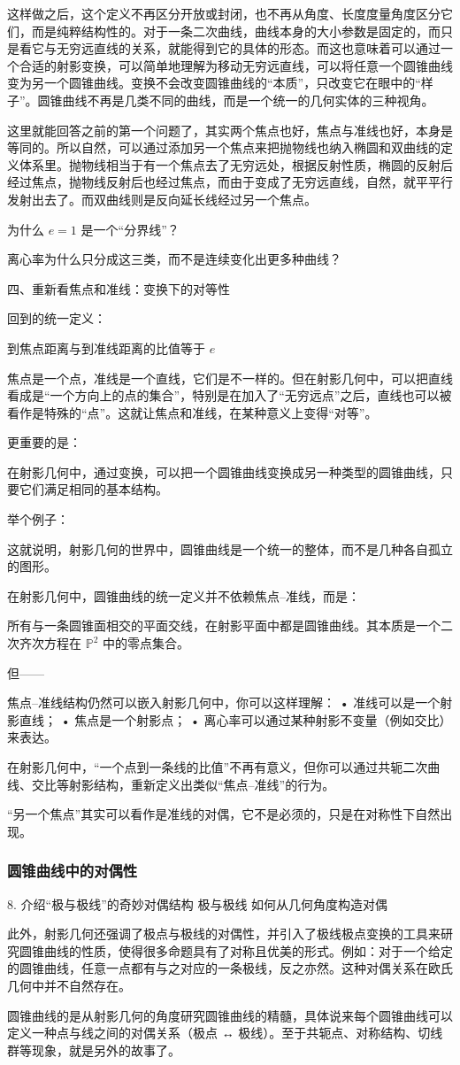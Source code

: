 这样做之后，这个定义不再区分开放或封闭，也不再从角度、长度度量角度区分它们，而是纯粹结构性的。对于一条二次曲线，曲线本身的大小参数是固定的，而只是看它与无穷远直线的关系，就能得到它的具体的形态。而这也意味着可以通过一个合适的射影变换，可以简单地理解为移动无穷远直线，可以将任意一个圆锥曲线变为另一个圆锥曲线。变换不会改变圆锥曲线的“本质”，只改变它在眼中的“样子”。圆锥曲线不再是几类不同的曲线，而是一个统一的几何实体的三种视角。

这里就能回答之前的第一个问题了，其实两个焦点也好，焦点与准线也好，本身是等同的。所以自然，可以通过添加另一个焦点来把抛物线也纳入椭圆和双曲线的定义体系里。抛物线相当于有一个焦点去了无穷远处，根据反射性质，椭圆的反射后经过焦点，抛物线反射后也经过焦点，而由于变成了无穷远直线，自然，就平平行发射出去了。而双曲线则是反向延长线经过另一个焦点。

为什么 $e=1$ 是一个“分界线”？

离心率为什么只分成这三类，而不是连续变化出更多种曲线？

四、重新看焦点和准线：变换下的对等性

回到的统一定义：

到焦点距离与到准线距离的比值等于 $e$

焦点是一个点，准线是一个直线，它们是不一样的。但在射影几何中，可以把直线看成是“一个方向上的点的集合”，特别是在加入了“无穷远点”之后，直线也可以被看作是特殊的“点”。这就让焦点和准线，在某种意义上变得“对等”。

更重要的是：

在射影几何中，通过变换，可以把一个圆锥曲线变换成另一种类型的圆锥曲线，只要它们满足相同的基本结构。

举个例子：


这就说明，射影几何的世界中，圆锥曲线是一个统一的整体，而不是几种各自孤立的图形。


在射影几何中，圆锥曲线的统一定义并不依赖焦点–准线，而是：

所有与一条圆锥面相交的平面交线，在射影平面中都是圆锥曲线。其本质是一个二次齐次方程在 $\mathbb{P}^2$ 中的零点集合。

但——

焦点–准线结构仍然可以嵌入射影几何中，你可以这样理解：
	•	准线可以是一个射影直线；
	•	焦点是一个射影点；
	•	离心率可以通过某种射影不变量（例如交比）来表达。

在射影几何中，“一个点到一条线的比值”不再有意义，但你可以通过共轭二次曲线、交比等射影结构，重新定义出类似“焦点–准线”的行为。

“另一个焦点”其实可以看作是准线的对偶，它不是必须的，只是在对称性下自然出现。


\subsubsection{圆锥曲线中的对偶性}


	8.	介绍“极与极线”的奇妙对偶结构
极与极线	如何从几何角度构造对偶

此外，射影几何还强调了极点与极线的对偶性，并引入了极线极点变换的工具来研究圆锥曲线的性质，使得很多命题具有了对称且优美的形式。例如：对于一个给定的圆锥曲线，任意一点都有与之对应的一条极线，反之亦然。这种对偶关系在欧氏几何中并不自然存在。

圆锥曲线的是从射影几何的角度研究圆锥曲线的精髓，具体说来每个圆锥曲线可以定义一种点与线之间的对偶关系（极点 ↔ 极线）。至于共轭点、对称结构、切线群等现象，就是另外的故事了。


